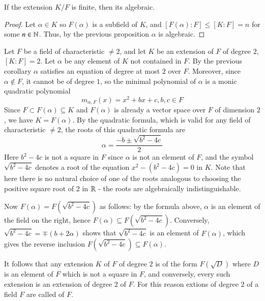 \begin{corollary}\label{cor:finalg}
    If the extension $K/F$ is finite, then its algebraic.
\end{corollary}
\begin{proof}
    Let $\alpha \in K$ so $F(\alpha)$ is a subfield of $K$, and $[F(\alpha):F] \leq [K:F] = n$ for some $n \in \mathbb N$. Thus, by the previous proposition $\alpha$ is algebraic.
\end{proof}



\begin{example}\label{eg:quadext}
    Let $F$ be a field of characteristic $\neq 2$, and let $K$ be an extension of $F$ of degree $2$, $[K:F] = 2$. Let $\alpha$ be any element of $K$ not contained in $F$. By the previous corollary $\alpha$ satisfies an equation of degree at most $2$ over $F$. Moreover, since $\alpha \notin F$, it cannot be of degree $1$, so the minimal polynomial of $\alpha$ is a monic quadratic polynomial \begin{equation*}
        m_{\alpha,F}(x) = x^2+bx+c, b,c \in F
    \end{equation*}
    Since $F \subset F(\alpha) \subseteq K$ and $F(\alpha)$ is already a vector space over $F$ of dimension $2$, we have $K = F(\alpha)$. By the quadratic formula, which is valid for any field of characteristic $\neq 2$, the roots of this quadratic formula are \begin{equation*}
        \alpha = \frac{-b\pm \sqrt{b^2-4c}}{2}
    \end{equation*}
    Here $b^2-4c$ is not a square in $F$ since $\alpha$ is not an element of $F$, and the symbol $\sqrt{b^2-4c}$ denotes a root of the equation $x^2-(b^2-4c)=0$ in $K$. Note that here there is no natural choice of one of the roots analogous to choosing the positive square root of $2$ in $\mathbb R$ - the roots are algebraically indistinguishable.


    Now $F(\alpha) = F(\sqrt{b^2-4c})$ as follows: by the formula above, $\alpha$ is an element of the field on the right, hence $F(\alpha) \subseteq F(\sqrt{b^2-4c})$. Conversely, $\sqrt{b^2-4c} = \mp(b+2\alpha)$ shows that $\sqrt{b^2-4c}$ is an element of $F(\alpha)$, which gives the reverse inclusion $F(\sqrt{b^2-4c}) \subseteq F(\alpha)$.
\end{example}

\begin{corollary}
    It follows that any extension $K$ of $F$ of degree $2$ is of the form $F(\sqrt{D})$ where $D$ is an element of $F$ which is not a square in $F$, and conversely, every such extension is an extension of degree $2$ of $F$. For this reason extions of degree $2$ of a field $F$ are called  of $F$.
\end{corollary}


